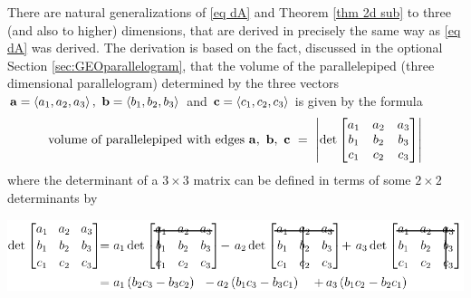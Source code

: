 There are natural generalizations of \eqref{eq dA} and 
Theorem \ref{thm 2d sub} to three (and also to higher) dimensions,
that are derived in precisely the same way as \eqref{eq dA}
was derived. The derivation is based on the fact, discussed in
the optional Section \ref{sec:GEOparallelogram}, that
the volume of the parallelepiped (three dimensional parallelogram) 
%
determined by the three vectors 
$\mathbf{a}=\left< a_1,a_2,a_3\right> ,\ \mathbf{b}=\left< b_1,b_2,b_3\right> $ and 
$\mathbf{c}=\left< c_1,c_2,c_3\right> $ is given by the formula
\begin{align*}
\text{volume of parallelepiped with edges $\va,\ \vb,\ \vc\ 
=\ \left|
\det\left[\begin{matrix}a_1&a_2&a_3\\ b_1&b_2&b_3\\ c_1&c_2&c_3\end{matrix}\right]
\right|$}
\end{align*}
where the determinant of a $3\times 3$ matrix can be defined in terms
of some $2\times 2$ determinants by
      \begin{center}
      \includegraphics{figures/geometry/det2}%
      \end{center}


